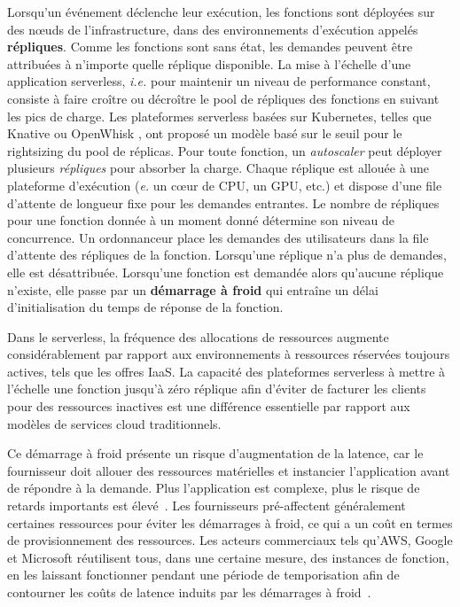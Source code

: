 Lorsqu'un événement déclenche leur exécution, les fonctions sont déployées sur des nœuds de l'infrastructure, dans des environnements d'exécution appelés \textbf{répliques}. Comme les fonctions sont sans état, les demandes peuvent être attribuées à n'importe quelle réplique disponible. La mise à l'échelle d'une application serverless, \textit{i.e.} pour maintenir un niveau de performance constant, consiste à faire croître ou décroître le pool de répliques des fonctions en suivant les pics de charge. Les plateformes serverless basées sur Kubernetes, telles que Knative \cite{knative} ou OpenWhisk \cite{openwhisk}, ont proposé un modèle basé sur le seuil pour le rightsizing du pool de réplicas. Pour toute fonction, un \textit{autoscaler} peut déployer plusieurs \textit{répliques} pour absorber la charge. Chaque réplique est allouée à une plateforme d'exécution (\textit{e.} un cœur de CPU, un GPU, etc.) et dispose d'une file d'attente de longueur fixe pour les demandes entrantes. Le nombre de répliques pour une fonction donnée à un moment donné détermine son niveau de concurrence. Un ordonnanceur place les demandes des utilisateurs dans la file d'attente des répliques de la fonction. Lorsqu'une réplique n'a plus de demandes, elle est désattribuée. Lorsqu'une fonction est demandée alors qu'aucune réplique n'existe, elle passe par un \textbf{démarrage à froid} qui entraîne un délai d'initialisation du temps de réponse de la fonction.

Dans le serverless, la fréquence des allocations de ressources augmente considérablement par rapport aux environnements à ressources réservées toujours actives, tels que les offres IaaS. La capacité des plateformes serverless à mettre à l'échelle une fonction jusqu'à zéro réplique afin d'éviter de facturer les clients pour des ressources inactives est une différence essentielle par rapport aux modèles de services cloud traditionnels.

Ce démarrage à froid présente un risque d'augmentation de la latence, car le fournisseur doit allouer des ressources matérielles et instancier l'application avant de répondre à la demande. Plus l'application est complexe, plus le risque de retards importants est élevé~\cite{mohanAgileColdStartsa}. Les fournisseurs pré-affectent généralement certaines ressources pour éviter les démarrages à froid, ce qui a un coût en termes de provisionnement des ressources. Les acteurs commerciaux tels qu'AWS, Google et Microsoft réutilisent tous, dans une certaine mesure, des instances de fonction, en les laissant fonctionner pendant une période de temporisation afin de contourner les coûts de latence induits par les démarrages à froid~\cite{vahidiniaColdStartServerless2020}.

